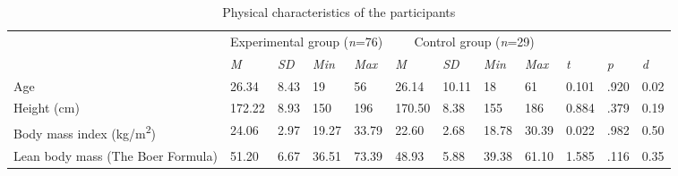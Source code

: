 \documentclass[authordate, empirical]{jote-new-article}
\begin{document}
\begin{table}
  \begin{fullwidth}
    \caption{Physical characteristics of the participants}
    \begin{tabularx}{\linewidth}{@{} >{\RaggedRight\arraybackslash}m{9em} X X X X X X X X | X X X@{}}
      \toprule                                           & \multicolumn{4}{c}{Experimental group (\emph{n}=76)} &
      \multicolumn{4}{c}{Control group (\emph{n}=29)}    &                                                      &            &                                                                            \\

                                                         & \emph{M}                                             & \emph{SD}  & \emph{Min} & \emph{Max} & \emph{M} & \emph{SD}
                                                         & \emph{Min}                                           & \emph{Max} & \emph{t}   & \emph{p}   & \emph{d}                                         \\

      \hline Age                                         & 26.34                                                & 8.43       & 19         & 56         & 26.14    & 10.11     & 18   & 61  & 0.101 & .920
                                                         & 0.02                                                                                                                                           \\

      Height (cm)                                        & 172.22                                               & 8.93       & 150        & 196        & 170.50   & 8.38      & 155  & 186 & 0.884
                                                         & .379                                                 & 0.19                                                                                    \\

      Body mass index \newline (kg/m\textsuperscript{2}) & 24.06                                                & 2.97       & 19.27      & 33.79
                                                         & 22.60                                                & 2.68       & 18.78      & 30.39      & 0.022    & .982      & 0.50                      \\

      Lean body mass \newline (The Boer Formula)         & 51.20                                                & 6.67       & 36.51      & 73.39      & 48.93
                                                         & 5.88                                                 & 39.38      & 61.10      & 1.585      & .116     & 0.35                                  \\
      \bottomrule
    \end{tabularx}
  \end{fullwidth}
\end{table}
\end{document}
